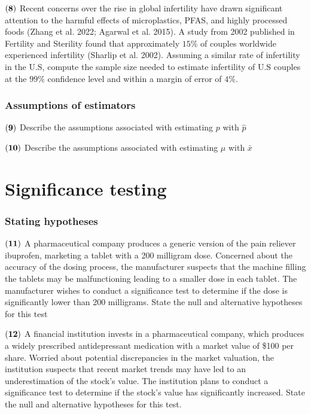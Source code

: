 \documentclass[
]{article}
\begin{document}
\(\bf (8)\) Recent concerns over the rise in global infertility have
drawn significant attention to the harmful effects of microplastics,
PFAS, and highly processed foods (Zhang et al. 2022; Agarwal et al.
2015). A study from 2002 published in Fertility and Sterility found that
approximately \(15\%\) of couples worldwide experienced infertility
(Sharlip et al. 2002). Assuming a similar rate of infertility in the
U.S, compute the sample size needed to estimate infertility of U.S
couples at the \(99\%\) confidence level and within a margin of error of
\(4\%\).

\subsubsection{Assumptions of
estimators}\label{assumptions-of-estimators}

\(\bf (9)\) Describe the assumptions associated with estimating \(p\)
with \(\hat{p}\)

\(\bf (10)\) Describe the assumptions associated with estimating \(\mu\)
with \(\bar{x}\)

\section{Significance testing}\label{significance-testing}

\subsubsection{Stating hypotheses}\label{stating-hypotheses}

\(\bf (11)\) A pharmaceutical company produces a generic version of the
pain reliever ibuprofen, marketing a tablet with a 200 milligram dose.
Concerned about the accuracy of the dosing process, the manufacturer
suspects that the machine filling the tablets may be malfunctioning
leading to a smaller dose in each tablet. The manufacturer wishes to
conduct a significance test to determine if the dose is significantly
lower than 200 milligrams. State the null and alternative hypotheses for
this test

\(\bf (12)\) A financial institution invests in a pharmaceutical
company, which produces a widely prescribed antidepressant medication
with a market value of \$100 per share. Worried about potential
discrepancies in the market valuation, the institution suspects that
recent market trends may have led to an underestimation of the stock's
value. The institution plans to conduct a significance test to determine
if the stock's value has significantly increased. State the null and
alternative hypotheses for this test.
\end{document}
